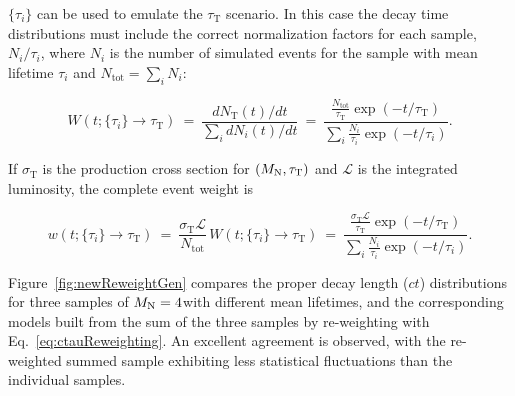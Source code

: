 $\{\tau_i\}$ can be used to emulate the $\tau_{\mathrm T}$ scenario. In this case the
decay time distributions must include the correct normalization
factors for each sample, $N_i/\tau_i$, where $N_i$ is the number of
simulated events for the sample with mean lifetime $\tau_i$ and
$N_{\mathrm{tot}} = \sum_i N_i$:
\begin{linenomath}
  \begin{equation*}
    W(t; \{\tau_i\}\to\tau_{\mathrm T}) ~=~ \frac{dN_{\mathrm T}(t)/dt}{\sum_i dN_i(t)/dt} ~=~
    \frac{\frac{N_{\mathrm{tot}}}{\tau_{\mathrm{T}}}\exp{(-t/\tau_{\mathrm{T}})}}
         {\sum_i\frac{N_{i}}{\tau_i}\exp{(-t/\tau_i)}}.
  \end{equation*}
\end{linenomath}
If $\sigma_{\mathrm{T}}$ is the production cross section for
$(M_{\mathrm{N}},\tau_{\mathrm T})$ and $\mathcal{L}$ is the integrated luminosity,
the complete event weight is
\begin{linenomath}
  \begin{equation}
    w(t; \{\tau_i\}\to\tau_{\mathrm T}) ~=~
    \frac{\sigma_{\mathrm{T}}\mathcal{L}}{N_{\mathrm{tot}}}\,W(t;\{\tau_i\}\to\tau_{\mathrm T})
     ~=~ \frac{\frac{\sigma_{\mathrm{T}}\mathcal{L}}{\tau_{\mathrm{T}}}\exp{(-t/\tau_{\mathrm{T}})}}
         {\sum_i\frac{N_{i}}{\tau_i}\exp{(-t/\tau_i)}}.
  \label{eq:ctauReweighting}
  \end{equation}
\end{linenomath}
Figure~\ref{fig:newReweightGen} compares the proper decay length ($ct$)
distributions for three samples of $M_{\mathrm{N}}=4$\GeV with different mean
lifetimes, and the corresponding models built from the sum of the
three samples by re-weighting with Eq.~\ref{eq:ctauReweighting}. An
excellent agreement is observed, with the re-weighted summed sample
exhibiting less statistical fluctuations than the individual samples.
